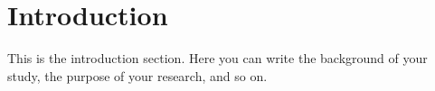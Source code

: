 \section{Introduction}

This is the introduction section. Here you can write the background of your study, the purpose of your research, and so on.

